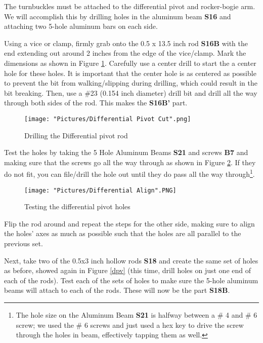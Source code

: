 \documentclass[12pt]{article}
\begin{document}
The turnbuckles must be attached to the differential pivot and rocker-bogie arm. We will accomplish this by drilling holes in the aluminum beam \textbf{S16} and attaching two 5-hole aluminum bars on each side.

Using a vice or clamp, firmly grab onto the 0.5 x 13.5 inch rod \textbf{S16B} with the end extending out around 2 inches from the edge of the vice/clamp. Mark the dimensions as shown in Figure \ref{diff pivot rod}. Carefully use a center drill to start the a center hole for these holes. It is important that the center hole is as centered as possible to prevent the bit from walking/slipping during drilling, which could result in the bit breaking. Then, use a \#23 (0.154 inch diameter) drill bit and drill all the way through both sides of the rod. This makes the \textbf{S16B'} part.

\begin{figure}[H]
\centering
  \texttt{[image: "Pictures/Differential Pivot Cut".png]}
	\caption{Drilling the Differential pivot rod}
	\label{diff pivot rod}
\end{figure}


Test the holes by taking the 5 Hole Aluminum Beams \textbf{S21} and screws \textbf{B7} and making sure that the screws go all the way through as shown in Figure \ref{test}. If they do not fit, you can file/drill the hole out until they do pass all the way through\footnote{The hole size on the Aluminum Beam \textbf{S21} is halfway between a \# 4 and \# 6 screw; we used the \# 6 screws and just used a hex key to drive the screw through the holes in beam, effectively tapping them as well.}.

\begin{figure}[H]
	\centering
	\texttt{[image: "Pictures/Differential Align".PNG]}
	\caption{Testing the differential pivot holes}
	\label{test}
\end{figure}

\noindent Flip the rod around and repeat the steps for the other side, making sure to align the holes' axes as much as possible such that the holes are all parallel to the previous set.


\noindent Next, take two of the 0.5x3 inch hollow rods \textbf{S18} and create the same set of holes as before, showed again in Figure \ref{dpv} (this time, drill holes on just one end of each of the rods). Test each of the sets of holes to make sure the 5-hole aluminum beams will attach to each of the rods. These will now be the part \textbf{S18B}.
\end{document}
